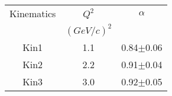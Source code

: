 \begin{center}
\begin{tabular}{||c|c|c||}\hline
 Kinematics & $Q^2$ & $\alpha$ \\
 & $(GeV/c)^2$ & \\\hline
Kin1 & 1.1 &0.84$\pm$0.06 \\
Kin2 & 2.2 &0.91$\pm$0.04 \\
Kin3 & 3.0 &0.92$\pm$0.05 \\\hline
\end{tabular}
\vspace{-0.5cm}
\end{center}